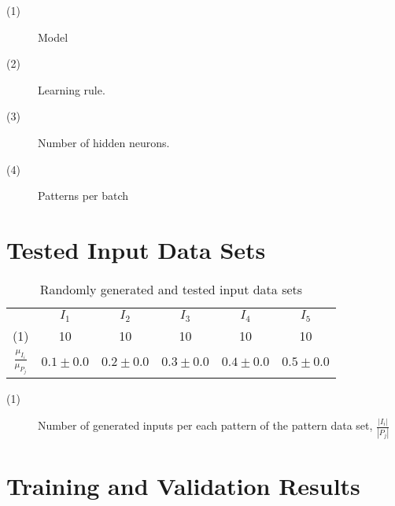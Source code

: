 \documentclass[anon]{CI}
\begin{document}
\begin{description}
	\item [(1)] Model
	\item [(2)] Learning rule.
	\item [(3)] Number of hidden neurons.
	\item [(4)] Patterns per batch
	\end {description}
	
	\section{Tested Input Data Sets}\label{AppC}
	
	
	
	\begin{table}[H]
		\centering
		\def\arraystretch{1.5}
		\begin{tabular}{cccccc}
			
			& $I_{1}$  & $I_{2}$  & $I_{3}$  & $I_{4}$  & $I_{5}$  \\ \cline{2-6}
			(1)  & 10  & 10  & 10  & 10  & 10 \\
			$\frac{\mu_{I_i}}{\mu_{P_j}}$  & $0.1\pm0.0$  & $0.2\pm0.0$  & $0.3\pm0.0$  & $0.4\pm0.0$  & $0.5\pm0.0$ 
		\end{tabular}
		\caption{Randomly generated and tested input data sets}
	\end{table}
	
	
	\begin{description}
		\item [(1)] Number of generated inputs per each pattern of the pattern data set, $\frac{\left|I_i\right|}{\left|P_j\right|}$
		\end {description}
		
		\section{Training and Validation Results}\label{AppD}
		
		
\end{document}
